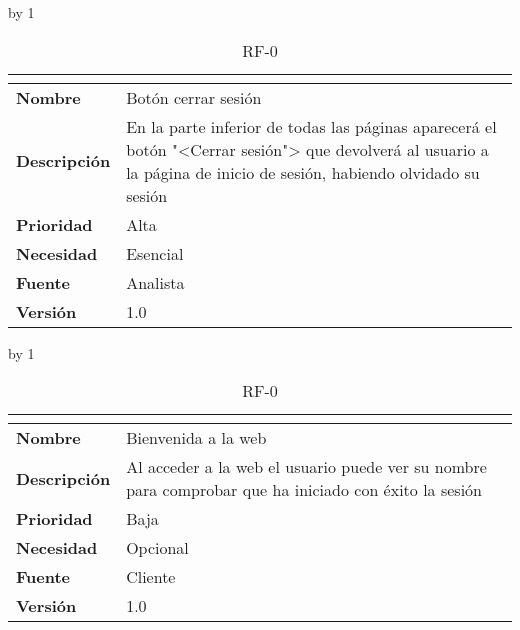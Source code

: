 \advance\rf by 1
\begin{table}[H]
	\caption{RF-0\number\rf}
	\begin{tabular}{|l|p{}|}
		\hline
		\multicolumn{2}{|c|}{\cellcolor[HTML]{BFBFBF}{\color[HTML]{000000} \textbf{RF-0\number\rf}}} \\ \hline
		\textbf{Nombre}      & Botón cerrar sesión                                                                                                                                                \\ \hline
		\textbf{Descripción} & En la parte inferior de todas las páginas aparecerá el botón "<Cerrar sesión"> que devolverá al usuario a la página de inicio de sesión, habiendo olvidado su sesión \\ \hline
		\textbf{Prioridad}   & Alta                                                                                                                                                               \\ \hline
		\textbf{Necesidad}   & Esencial                                                                                                                                                           \\ \hline
		\textbf{Fuente}      & Analista                                                                                                                                                           \\ \hline
		\textbf{Versión}     & 1.0                                                                                                                                                                \\ \hline
	\end{tabular}
\end{table}
\advance\rf by 1
\begin{table}[H]
	\caption{RF-0\number\rf}
	\begin{tabular}{|l|p{}|}
		\hline
		\multicolumn{2}{|c|}{\cellcolor[HTML]{BFBFBF}{\color[HTML]{000000} \textbf{RF-0\number\rf}}} \\ \hline
		\textbf{Nombre}      & Bienvenida a la web                                                                                   \\ \hline
		\textbf{Descripción} & Al acceder a la web el usuario puede ver su nombre para comprobar que ha iniciado con éxito la sesión \\ \hline
		\textbf{Prioridad}   & Baja                                                                                                  \\ \hline
		\textbf{Necesidad}   & Opcional                                                                                              \\ \hline
		\textbf{Fuente}      & Cliente                                                                                               \\ \hline
		\textbf{Versión}     & 1.0                                                                                                   \\ \hline
	\end{tabular}
\end{table}
